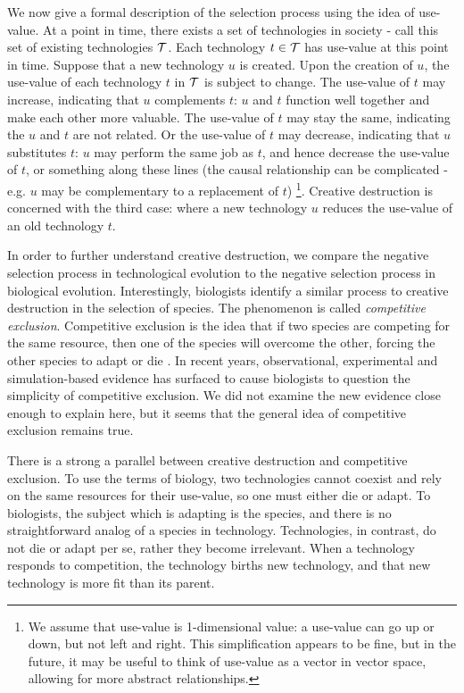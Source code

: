 \documentclass[11pt]{article}
\begin{document}
We now give a formal description of the selection process using the idea of use-value. 
At a point in time, there exists a set of technologies in society - call this set of existing technologies $\mathcal{T}$. 
Each technology $t \in \mathcal{T}$ has use-value at this point in time. 
Suppose that a new technology $u$ is created.
Upon the creation of $u$, the use-value of each technology $t$ in $\mathcal{T}$ is subject to change.
The use-value of $t$ may increase, indicating that $u$ complements $t$: $u$ and $t$ function well together and make each other more valuable.
The use-value of $t$ may stay the same, indicating the $u$ and $t$ are not related.
Or the use-value of $t$ may decrease, indicating that $u$ substitutes $t$: $u$ may perform the same job as $t$, and hence decrease the use-value of $t$, or something along these lines (the causal relationship can be complicated - e.g. $u$ may be complementary to a replacement of $t$)
\footnote{We assume that use-value is 1-dimensional value: a use-value can go up or down, but not left and right. 
This simplification appears to be fine, but in the future, it may be useful to think of use-value as a vector in vector space, allowing for more abstract relationships.}.
Creative destruction is concerned with the third case: where a new technology $u$ reduces the use-value of an old technology $t$. 

In order to further understand creative destruction, we compare the negative selection process in technological evolution to the negative selection process in biological evolution.
Interestingly, biologists identify a similar process to creative destruction in the selection of species.
The phenomenon is called \textit{competitive exclusion}. 
Competitive exclusion is the idea that if two species are competing for the same resource, then one of the species will overcome the other, forcing the other species to adapt or die \cite{wiki}. 
In recent years, observational, experimental and simulation-based evidence has surfaced to cause biologists to question the simplicity of competitive exclusion.
We did not examine the new evidence close enough to explain here, but it seems that the general idea of competitive exclusion remains true.

There is a strong a parallel between creative destruction and competitive exclusion.
To use the terms of biology, two technologies cannot coexist and rely on the same resources for their use-value, so one must either die or adapt. 
To biologists, the subject which is adapting is the species, and there is no straightforward analog of a species in technology. 
Technologies, in contrast, do not die or adapt per se, rather they become irrelevant.
When a technology responds to competition, the technology births new technology, and that new technology is more fit than its parent.
\end{document}
